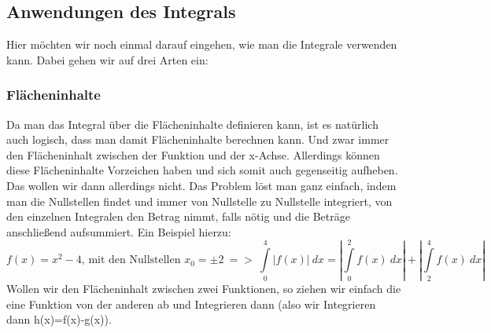 \subsection{Anwendungen des Integrals}
	Hier möchten wir noch einmal darauf eingehen, wie man die Integrale verwenden
	kann. Dabei gehen wir auf drei Arten ein:

	\subsubsection{Flächeninhalte}
		Da man das Integral über die Flächeninhalte definieren kann, ist es natürlich
		auch logisch, dass man damit Flächeninhalte berechnen kann. Und zwar immer
		den Flächeninhalt zwischen der Funktion und der x-Achse. Allerdings können diese Flächeninhalte Vorzeichen haben und sich somit auch gegenseitig aufheben. Das wollen wir dann allerdings nicht. 
		Das Problem löst man ganz einfach, indem man die Nullstellen findet und immer
		von Nullstelle zu Nullstelle integriert, von den einzelnen Integralen den
		Betrag nimmt, falls nötig und die Beträge anschließend aufsummiert. Ein
		Beispiel hierzu:
		\[f(x)=x^2-4\textrm{, mit den Nullstellen }x_0=\pm2\ =>\ \int\limits_0^4
		|f(x)|\ dx=|\int\limits_0^2 f(x)\ dx|+|\int\limits_2^4 f(x)\ dx|\]
		Wollen wir den Flächeninhalt zwischen zwei Funktionen, so ziehen wir einfach
		die eine Funktion von der anderen ab und Integrieren dann (also wir Integrieren dann h(x)=f(x)-g(x)).

